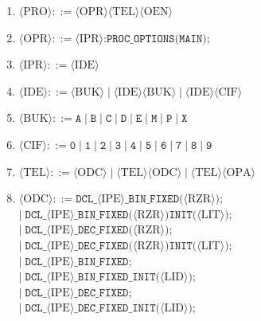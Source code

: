 \documentclass[a4paper,14pt]{extarticle}
\begin{document}
\begin{enumerate}
  \item $\langle\text{PRO}\rangle ::= \langle\text{OPR}\rangle\langle\text{TEL}\rangle\langle\text{OEN}\rangle$
  \item $\langle\text{OPR}\rangle ::= \langle\text{IPR}\rangle\texttt{:PROC\_OPTIONS(MAIN);}$
  \item $\langle\text{IPR}\rangle ::= \langle\text{IDE}\rangle$
  \item $\langle\text{IDE}\rangle ::= \langle\text{BUK}\rangle \mid \langle\text{IDE}\rangle\langle\text{BUK}\rangle \mid \langle\text{IDE}\rangle\langle\text{CIF}\rangle$
  \item $\langle\text{BUK}\rangle ::= \texttt{A} \mid \texttt{B} \mid \texttt{C} \mid \texttt{D} \mid \texttt{E} \mid \texttt{M} \mid \texttt{P} \mid \texttt{X}$
  \item $\langle\text{CIF}\rangle ::= \texttt{0} \mid \texttt{1} \mid \texttt{2} \mid \texttt{3} \mid \texttt{4} \mid \texttt{5} \mid \texttt{6} \mid \texttt{7} \mid \texttt{8} \mid \texttt{9}$
  \item $\langle\text{TEL}\rangle ::= \langle\text{ODC}\rangle \mid \langle\text{TEL}\rangle\langle\text{ODC}\rangle \mid \langle\text{TEL}\rangle\langle\text{OPA}\rangle$
  \item $\langle\text{ODC}\rangle ::= \texttt{DCL\_}\langle\text{IPE}\rangle\texttt{\_BIN\_FIXED(}\langle\text{RZR}\rangle\texttt{);}$\\
        $\mid\; \texttt{DCL\_}\langle\text{IPE}\rangle\texttt{\_BIN\_FIXED(}\langle\text{RZR}\rangle\texttt{)INIT(}\langle\text{LIT}\rangle\texttt{);}$\\
        \textit{$\mid\; \texttt{DCL\_}\langle\text{IPE}\rangle\texttt{\_DEC\_FIXED(}\langle\text{RZR}\rangle\texttt{);}$}\\
        \textit{$\mid\; \texttt{DCL\_}\langle\text{IPE}\rangle\texttt{\_DEC\_FIXED(}\langle\text{RZR}\rangle\texttt{)INIT(}\langle\text{LIT}\rangle\texttt{);}$}\\
        \textit{$\mid\; \texttt{DCL\_}\langle\text{IPE}\rangle\texttt{\_BIN\_FIXED;}$}\\
        \textit{$\mid\; \texttt{DCL\_}\langle\text{IPE}\rangle\texttt{\_BIN\_FIXED\_INIT(}\langle\text{LID}\rangle\texttt{);}$}\\
        \textit{$\mid\; \texttt{DCL\_}\langle\text{IPE}\rangle\texttt{\_DEC\_FIXED;}$}\\
        \textit{$\mid\; \texttt{DCL\_}\langle\text{IPE}\rangle\texttt{\_DEC\_FIXED\_INIT(}\langle\text{LID}\rangle\texttt{);}$}

\end{enumerate}
\end{document}
